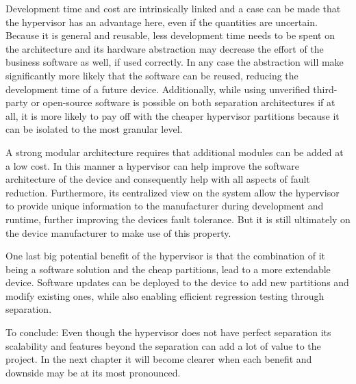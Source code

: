 Development time and cost are intrinsically linked and a case can be made that the hypervisor has an advantage here, even if the quantities are uncertain. Because it is general and reusable, less development time needs to be spent on the architecture and its hardware abstraction may decrease the effort of the business software as well, if used correctly. In any case the abstraction will make significantly more likely that the software can be reused, reducing the development time of a future device.
Additionally, while using unverified third-party or open-source software is possible on both separation architectures if at all, it is more likely to pay off with the cheaper hypervisor partitions because it can be isolated to the most granular level.

A strong modular architecture requires that additional modules can be added at a low cost. In this manner a hypervisor can help improve the software architecture of the device and consequently help with all aspects of fault reduction. Furthermore, its centralized view on the system allow the hypervisor to provide unique information to the manufacturer during development and runtime, further improving the devices fault tolerance.
But it is still ultimately on the device manufacturer to make use of this property.

One last big potential benefit of the hypervisor is that the combination of it being a software solution and the cheap partitions, lead to a more extendable device. Software updates can be deployed to the device to add new partitions and modify existing ones, while also enabling efficient regression testing through separation.

To conclude: Even though the hypervisor does not have perfect separation its scalability and features beyond the separation can add a lot of value to the project. In the next chapter it will become clearer when each benefit and downside may be at its most pronounced.